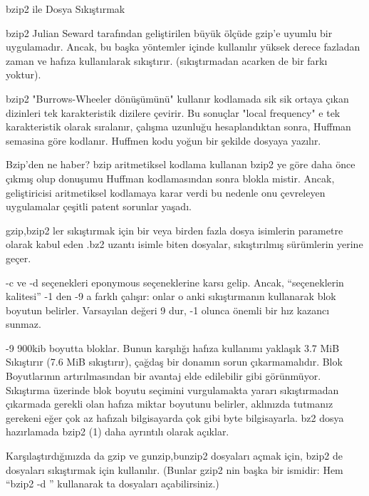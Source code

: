 \documentclass[10pt,a5paper]{book}
\begin{document}
\begin{section}{bzip2 ile Dosya Sıkıştırmak}

bzip2 Julian Seward tarafından geliştirilen büyük ölçüde gzip'e uyumlu bir uygulamadır. Ancak, bu başka yöntemler içinde kullanılır yüksek derece fazladan zaman ve hafıza kullanılarak sıkıştırır.  (sıkıştırmadan acarken de bir farkı yoktur).

bzip2 "Burrows-Wheeler dönüşümünü" kullanır kodlamada sik sik ortaya çıkan dizinleri tek karakteristik dizilere çevirir. Bu sonuçlar "local frequency" e tek karakteristik olarak sıralanır, çalışma uzunluğu hesaplandıktan sonra, Huffman semasina göre kodlanır. Huffmen kodu yoğun bir şekilde dosyaya yazılır.

Bzip'den ne haber? bzip aritmetiksel kodlama kullanan bzip2 ye göre daha önce çıkmış olup donuşumu Huffman kodlamasından sonra blokla mistir. Ancak, geliştiricisi aritmetiksel kodlamaya karar verdi bu nedenle onu çevreleyen uygulamalar çeşitli patent sorunlar yaşadı.

gzip,bzip2 ler sıkıştırmak için bir veya birden fazla dosya isimlerin parametre olarak kabul eden .bz2 uzantı isimle biten dosyalar, sıkıştırılmış sürümlerin yerine geçer.

-c ve -d seçenekleri eponymous seçeneklerine karsı gelip. Ancak, “seçeneklerin kalitesi” -1 den -9 a farklı çalışır: onlar o anki sıkıştırmanın kullanarak blok boyutun belirler. Varsayılan değeri 9 dur, -1 olunca önemli bir hız kazancı sunmaz.

-9 900kib boyutta bloklar. Bunun karşılığı hafıza kullanımı yaklaşık 3.7 MiB
Sıkıştırır (7.6 MiB sıkıştırır), çağdaş bir donamın sorun çıkarmamalıdır. Blok
Boyutlarının artırılmasından bir avantaj elde edilebilir gibi görünmüyor. Sıkıştırma üzerinde blok boyutu seçimini vurgulamakta yararı sıkıştırmadan çıkarmada gerekli olan hafıza miktar boyutunu belirler, aklınızda tutmanız gerekeni eğer çok az hafızalı bilgisayarda çok gibi byte bilgisayarla. bz2 dosya hazırlamada bzip2 (1) daha ayrıntılı olarak açıklar.

Karşılaştırdığınızda da gzip ve gunzip,bunzip2 dosyaları açmak için, bzip2 de dosyaları sıkıştırmak için kullanılır. (Bunlar gzip2 nin başka bir ismidir: Hem “bzip2 -d ” kullanarak ta dosyaları açabilirsiniz.)
\end{section}
\end{document}
